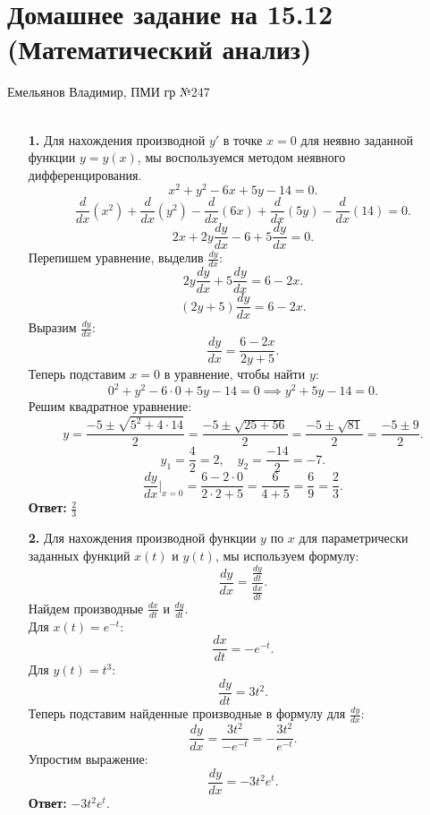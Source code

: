 \documentclass[a4paper]{article}
\renewcommand{\f}[2]{\frac{#1}{#2}}
\begin{document}
\section*{Домашнее задание на 15.12 (Математический анализ)}
 {\large Емельянов Владимир, ПМИ гр №247}\\\\
\begin{enumerate}
    \item[\textbf{1.}]Для нахождения производной $ y' $ в точке $ x = 0 $ для неявно заданной функции $ y = y(x) $, мы воспользуемся методом неявного дифференцирования.
    $$
    x^{2} + y^{2} - 6x + 5y - 14 = 0.
    $$
    $$
    \frac{d}{dx}(x^{2}) + \frac{d}{dx}(y^{2}) - \frac{d}{dx}(6x) + \frac{d}{dx}(5y) - \frac{d}{dx}(14) = 0.
    $$
    $$
    2x + 2y \frac{dy}{dx} - 6 + 5 \frac{dy}{dx} = 0.
    $$
    Перепишем уравнение, выделив $ \frac{dy}{dx} $:
    $$
    2y \frac{dy}{dx} + 5 \frac{dy}{dx} = 6 - 2x.
    $$
    $$
    (2y + 5) \frac{dy}{dx} = 6 - 2x.
    $$
    Выразим $ \frac{dy}{dx} $:
    $$
    \frac{dy}{dx} = \frac{6 - 2x}{2y + 5}.
    $$
    Теперь подставим $ x = 0 $ в уравнение, чтобы найти $ y $:
    $$
    0^{2} + y^{2} - 6 \cdot 0 + 5y - 14 = 0 \implies y^{2} + 5y - 14 = 0.
    $$
    Решим квадратное уравнение:
    $$
    y = \frac{-5 \pm \sqrt{5^{2} + 4 \cdot 14}}{2} = \frac{-5 \pm \sqrt{25 + 56}}{2} = \frac{-5 \pm \sqrt{81}}{2} = \frac{-5 \pm 9}{2}.
    $$
    $$
    y_{1} = \frac{4}{2} = 2, \quad y_{2} = \frac{-14}{2} = -7.
    $$
    $$
    \frac{dy}{dx} \bigg|_{x=0} = \frac{6 - 2 \cdot 0}{2 \cdot 2 + 5} = \frac{6}{4 + 5} = \frac{6}{9} = \frac{2}{3}.
    $$
    \textbf{Ответ: }$\f{2}{3}$\\

    \item[\textbf{2.}]Для нахождения производной функции $ y $ по $ x $ для параметрически заданных функций $ x(t) $ и $ y(t) $, мы используем формулу:
    $$
    \frac{dy}{dx} = \frac{\frac{dy}{dt}}{\frac{dx}{dt}}.
    $$
    Найдем производные $ \frac{dx}{dt} $ и $ \frac{dy}{dt} $.\\
    Для $ x(t) = e^{-t} $:
    $$
    \frac{dx}{dt} = -e^{-t}.
    $$
    Для $ y(t) = t^{3} $:
    $$
    \frac{dy}{dt} = 3t^{2}.
    $$
    Теперь подставим найденные производные в формулу для $ \frac{dy}{dx} $:
    $$
    \frac{dy}{dx} = \frac{3t^{2}}{-e^{-t}} = -\frac{3t^{2}}{e^{-t}}.
    $$
    Упростим выражение:
    $$
    \frac{dy}{dx} = -3t^{2} e^{t}.
    $$
    \textbf{Ответ: }$-3t^{2} e^{t}.$


\end{enumerate}
\end{document}
